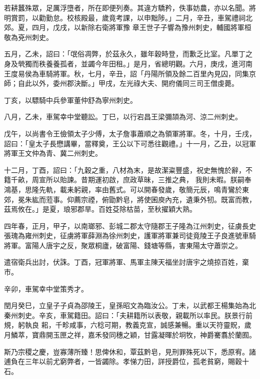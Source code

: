 \begin{pinyinscope}
 若耕蠶殊眾，足厲浮墮者，所在即便列奏。其違方驕矜，佚事妨農，亦以名聞。將明賞罰，以勸勤怠。校核殿最，歲竟考課，以申黜陟。」二月，辛丑，車駕禮祠北郊。夏，四月，戊戌，以新除右衛將軍豫
 章王世子子響為豫州刺史，輔國將軍桓敬為兗州刺史。



 五月，乙未，詔曰：「氓俗凋弊，於茲永久，雖年穀時登，而歉乏比室。凡單丁之身及煢獨而秩養養孤者，並蠲今年田租。」是月，省總明觀。六月，庚戌，進河南王度易侯為車騎將軍。秋，七月，辛丑，詔「丹陽所領及餘二百里內見囚，同集京師；自此以外，委州郡決斷。」甲戌，左光祿大夫、開府儀同三司王僧虔薨。



 丁亥，以驃騎中兵參軍董仲舒為寧州刺史。



 八月，乙未，車駕幸中堂聽訟。丁巳，以行宕昌王梁彌頡為河、涼二州刺史。



 戊午，以尚書令王儉領太子少傅，太子詹事蕭順之為領軍將軍。冬，十月，壬戌，詔曰：「皇太子長懋講畢，當釋奠，王公以下可悉往觀禮。」十一月，乙丑，以冠軍將軍王文仲為青、冀二州刺史。



 十二月，丁酉，詔曰：「九穀之重，八材為末，是故潔粢豐盛，祝史無愧於辭，不籍千畝，周宣所以貽諫。昔期運初啟，庶政草昧，三推之典，
 我則未暇。朕嗣奉鴻基，思隆先軌，載耒躬親，率由舊式。可以開春發歲，敬簡元辰，鳴青鸞於東郊，冕朱紘而蒞事。仰薦宗禋，俯勖黔皂，將使囷庾內充，遺秉外牣。既富而教，茲焉攸在。」是夏，琅邪郡旱。百姓芟除枯苗，至秋擢穎大熟。



 四年春，正月，甲子，以南瑯邪、彭城二郡太守隨郡王子隆為江州刺史，征虜長史張瑰為雍州刺史，征虜將軍薛淵為徐州刺史，護軍將軍兼司徒竟陵王子良進號車騎將軍。富陽人唐宇之反，聚眾桐廬，破富陽、錢塘等縣，害東陽太守蕭崇之。



 遣宿衛兵出討，伏誅。丁酉，冠軍將軍、馬軍主陳天福坐討唐宇之燒掠百姓，棄市。



 辛卯，車駕幸中堂策秀才。



 閏月癸巳，立皇子子貞為邵陵王，皇孫昭文為臨汝公。丁未，以武都王楊集始為北秦州刺史。辛亥，車駕籍田。詔曰：「夫耕籍所以表敬，親載所以率民。朕景行前規，躬執良
 耜，千畛咸事，六稔可期，教義克宣，誠感兼暢。重以天符靈貺，歲月鱗萃，寶鼎開玉匣之祥，嘉禾發同穗之穎，甘露凝暉於坰牧，神爵騫翥於蘭囿。



 斯乃宗稷之慶，豈寡薄所臻！思俾休和，覃茲黔皂，見刑罪殊死以下，悉原宥。諸逋負在三年以前尤窮弊者，一皆蠲除。孝悌力田，詳授爵位，孤老貧窮，賜穀十石。




\end{pinyinscope}
